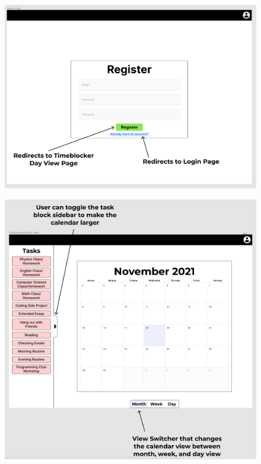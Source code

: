 \documentclass[12pt]{report}
\begin{document}
\begin{figure}[H]
\includegraphics[width=\textwidth]{register-page.png}
\end{figure}

\begin{figure}[H]
\includegraphics[width=\textwidth]{month-view.png}
\end{figure}
\end{document}
